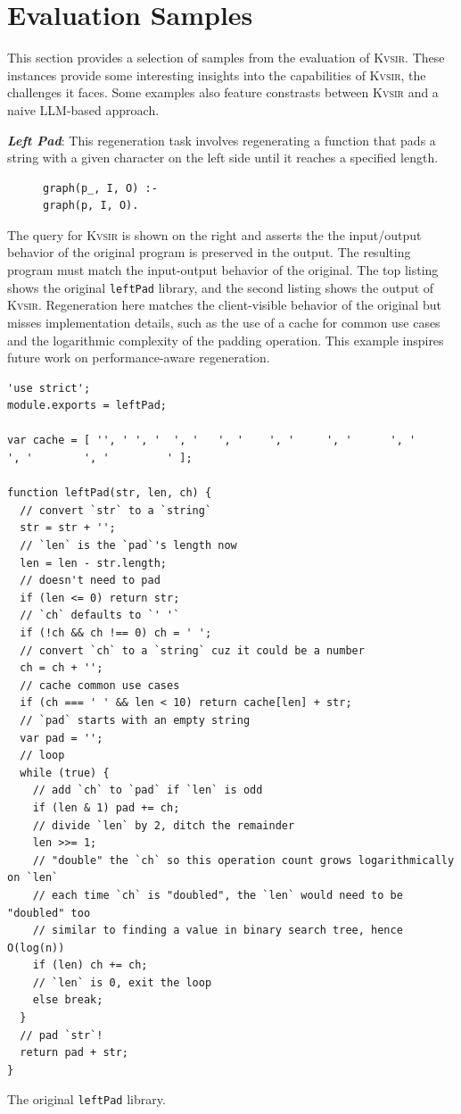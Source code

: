 \documentclass[sigplan,review,anonymous,10pt]{acmart}
\newcommand{\sys}{{\scshape Kv{\textalpha}sir}\xspace}
\newcommand{\heading}[1]{\vspace{2pt}\noindent\textbf{\emph{#1}}:\enspace}
\newcommand{\ttt}[1]{\texttt{#1}\xspace}
\begin{document}



\appendix

\section{Evaluation Samples}
This section provides a selection of samples from the evaluation of \sys.
These instances provide some interesting insights into the capabilities of \sys, the challenges it faces.
Some examples also feature constrasts between \sys and a naive LLM-based approach.

\heading{Left Pad}
This regeneration task involves regenerating a
function that pads a string with a given character on the left side until it
reaches a specified length.
\begin{figure}
\begin{verbatim}
graph(p_, I, O) :-
graph(p, I, O).
\end{verbatim}
\end{figure}
The query for \sys is shown on the right and asserts the the input/output behavior of the
original program is preserved in the output.
The resulting program must match the input-output behavior of the original.
The top listing shows the original \ttt{leftPad} library, and the second listing shows the output
of \sys.
Regeneration here matches the client-visible behavior of the original but misses
implementation details, such as the use of a cache for common
use cases and the logarithmic complexity of the padding operation.
This example inspires future work on performance-aware regeneration.

\begin{listing}[htpb]
\begin{verbatim}
'use strict';
module.exports = leftPad;

var cache = [ '', ' ', '  ', '   ', '    ', '     ', '      ', '       ', '        ', '         ' ];

function leftPad(str, len, ch) {
  // convert `str` to a `string`
  str = str + '';
  // `len` is the `pad`'s length now
  len = len - str.length;
  // doesn't need to pad
  if (len <= 0) return str;
  // `ch` defaults to `' '`
  if (!ch && ch !== 0) ch = ' ';
  // convert `ch` to a `string` cuz it could be a number
  ch = ch + '';
  // cache common use cases
  if (ch === ' ' && len < 10) return cache[len] + str;
  // `pad` starts with an empty string
  var pad = '';
  // loop
  while (true) {
    // add `ch` to `pad` if `len` is odd
    if (len & 1) pad += ch;
    // divide `len` by 2, ditch the remainder
    len >>= 1;
    // "double" the `ch` so this operation count grows logarithmically on `len`
    // each time `ch` is "doubled", the `len` would need to be "doubled" too
    // similar to finding a value in binary search tree, hence O(log(n))
    if (len) ch += ch;
    // `len` is 0, exit the loop
    else break;
  }
  // pad `str`!
  return pad + str;
}
  \end{verbatim}
\caption{The original \ttt{leftPad} library.}
\end{listing}
\end{document}
